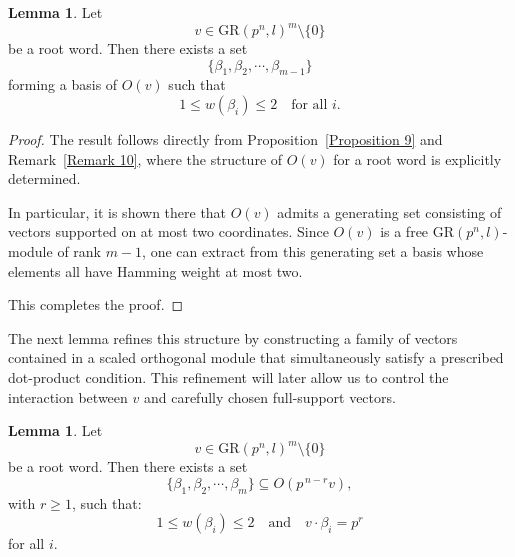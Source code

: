 \documentclass[10pt]{article}
\theoremstyle{definition}
\newtheorem{lemma}[lem]{Lemma}
\begin{document}
\begin{lemma}\label{Lemma 25}
Let
\[
v\in \mathrm{GR}(p^n,l)^m\setminus\{0\}
\]
be a root word. Then there exists a set
\[
\{\beta_1,\beta_2,\cdots,\beta_{m-1}\}
\]
forming a basis of $O(v)$ such that
\[
1\leq w(\beta_i)\leq 2
\quad \text{for all } i.
\]
\end{lemma}

\begin{proof}
The result follows directly from Proposition~\ref{Proposition 9}
and Remark~\ref{Remark 10}, where the structure of $O(v)$
for a root word is explicitly determined.

In particular, it is shown there that $O(v)$ admits a generating set
consisting of vectors supported on at most two coordinates.
Since $O(v)$ is a free $\mathrm{GR}(p^n,l)$-module of rank $m-1$,
one can extract from this generating set a basis
whose elements all have Hamming weight at most two.

This completes the proof.
\end{proof}

\medskip

The next lemma refines this structure by constructing
a family of vectors contained in a scaled orthogonal module
that simultaneously satisfy a prescribed dot-product condition.
This refinement will later allow us to control the interaction
between $v$ and carefully chosen full-support vectors.

\begin{lemma}\label{Lemma 26}
Let
\[
v\in \mathrm{GR}(p^n,l)^m\setminus\{0\}
\]
be a root word. Then there exists a set
\[
\{\beta_1,\beta_2,\cdots,\beta_m\}
\subseteq O(p^{\,n-r}v),
\]
with $r\ge 1$, such that:
\[
1\leq w(\beta_i)\leq 2
\quad \text{and} \quad
v\cdot \beta_i=p^r
\]
for all $i$.
\end{lemma}
\end{document}
